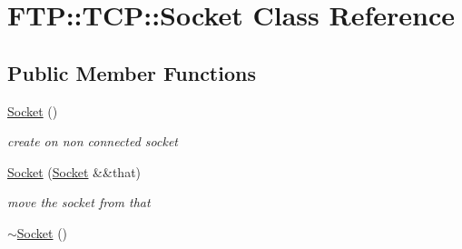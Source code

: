 \hypertarget{classFTP_1_1TCP_1_1Socket}{}\section{F\+T\+P\+:\+:T\+C\+P\+:\+:Socket Class Reference}
\label{classFTP_1_1TCP_1_1Socket}
\subsection*{Public Member Functions}
\begin{DoxyCompactItemize}
\item 
\hypertarget{classFTP_1_1TCP_1_1Socket_a38968f94a259b3052b4aada84ed7bcca}{}\hyperlink{classFTP_1_1TCP_1_1Socket_a38968f94a259b3052b4aada84ed7bcca}{Socket} ()\label{classFTP_1_1TCP_1_1Socket_a38968f94a259b3052b4aada84ed7bcca}

\begin{DoxyCompactList}\small\item\em create on non connected socket \end{DoxyCompactList}\item 
\hypertarget{classFTP_1_1TCP_1_1Socket_a13f3818892ac508f3240ca55db98459b}{}\hyperlink{classFTP_1_1TCP_1_1Socket_a13f3818892ac508f3240ca55db98459b}{Socket} (\hyperlink{classFTP_1_1TCP_1_1Socket}{Socket} \&\&that)\label{classFTP_1_1TCP_1_1Socket_a13f3818892ac508f3240ca55db98459b}

\begin{DoxyCompactList}\small\item\em move the socket from \textquotesingle{}that\textquotesingle{} \end{DoxyCompactList}\item 
\hypertarget{classFTP_1_1TCP_1_1Socket_a17e008f492188ab6f9114ff68b0c160b}{}\hyperlink{classFTP_1_1TCP_1_1Socket_a17e008f492188ab6f9114ff68b0c160b}{$\sim$\+Socket} ()\label{classFTP_1_1TCP_1_1Socket_a17e008f492188ab6f9114ff68b0c160b}


\end{DoxyCompactItemize}
